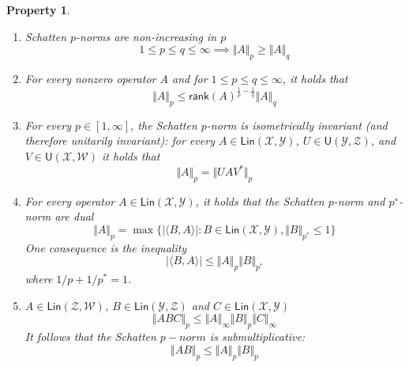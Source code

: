 \documentclass[aps,pra,onecolumn,notitlepage,superscriptaddress]{revtex4-1}
\newcommand{\spc}[1]{\mathcal{#1}}
\newcommand{\Lin}{\mathsf{Lin}}
\newcommand{\U}{\mathsf{U}}
\newcommand{\rank}{\mathsf{rank}}
\def\>{\rangle}
\def\<{\langle}
\newtheorem{proper}{Property}
\begin{document}
    \begin{proper}
        \begin{enumerate}
            \item  Schatten $p$-norms are non-increasing in $p$
            \begin{equation}
                1 \leq p \leq q \leq \infty \implies \Vert A \Vert_p \geq \Vert A \Vert_q
            \end{equation}
            \item  For every nonzero operator $A$ and for $1 \leq p \leq q \leq \infty$, it holds that
            \begin{equation}
                \Vert A \Vert_p \leq \rank(A)^{\frac{1}{p}-\frac{1}{q}} \Vert A \Vert_q
            \end{equation}
            \item For every $p \in [1, \infty]$, the Schatten $p$-norm is isometrically invariant (and therefore unitarily invariant): for every $A \in \Lin(\spc X, \spc Y)$, $U \in \U(\spc Y, \spc Z)$, and $V \in \U(\spc X, \spc W)$ it holds that
            \begin{equation}
                \Vert A \Vert_p = \Vert UAV^* \Vert_p
            \end{equation}

            \item For every operator $A \in \Lin(\spc X, \spc Y)$, it holds that the Schatten $p$-norm and $p^∗$-norm are dual
            \begin{equation}
                \Vert A \Vert_p = \max \{ |\< B,A \>| : B \in \Lin(\spc X, \spc Y), \Vert B \Vert_{p^*} \leq 1 \}
            \end{equation}
            One consequence is the inequality
            \begin{equation}
                |\< B,A \>| \leq \Vert A \Vert_p\Vert B \Vert_{p^*}
            \end{equation}
            where $1/p + 1/p^* = 1$.

            \item $A \in \Lin(\spc Z, \spc W)$, $B \in \Lin(\spc Y, \spc Z)$ and $C \in \Lin(\spc X, \spc Y)$
            \begin{equation}
                \Vert ABC \Vert_p \leq \Vert A \Vert_{\infty} \Vert B \Vert_p \Vert C \Vert_{\infty}
            \end{equation}
            It follows that the Schatten $p-norm$ is submultiplicative:
            \begin{equation}
                \Vert AB \Vert_p \leq \Vert A \Vert_p \Vert B \Vert_p
            \end{equation}


\end{enumerate}
\end{proper}
\end{document}
